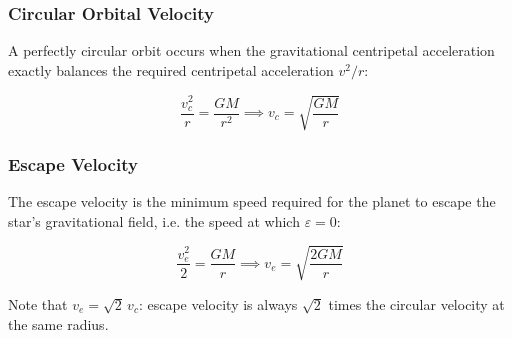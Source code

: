 \subsubsection{Circular Orbital Velocity}

A perfectly circular orbit occurs when the gravitational centripetal acceleration exactly balances the required centripetal acceleration $v^2/r$:

\begin{equation}
\frac{v_c^2}{r} = \frac{GM}{r^2} \implies v_c = \sqrt{\frac{GM}{r}}
\end{equation}

\subsubsection{Escape Velocity}

The escape velocity is the minimum speed required for the planet to escape the star's gravitational field, i.e. the speed at which $\varepsilon = 0$:

\begin{equation}
\frac{v_e^2}{2} = \frac{GM}{r} \implies v_e = \sqrt{\frac{2GM}{r}}
\end{equation}

Note that $v_e = \sqrt{2}\,v_c$: escape velocity is always $\sqrt{2}$ times the circular velocity at the same radius.